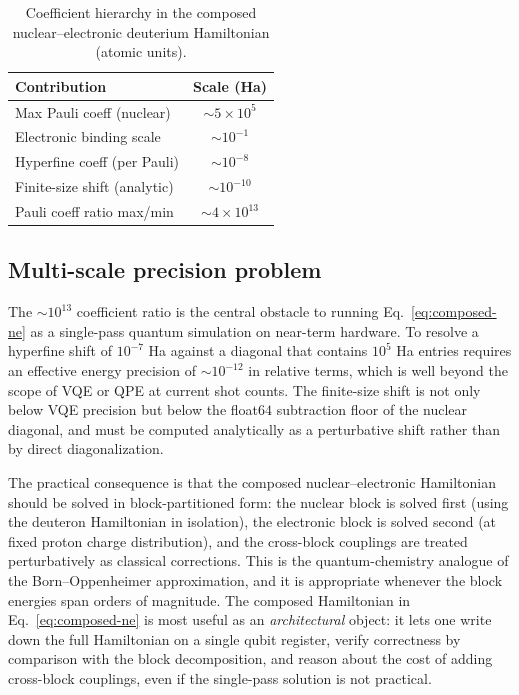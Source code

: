 \documentclass[twocolumn,prc,amsmath,amssymb,superscriptaddress]{revtex4-2}
\begin{document}
\begin{table}[t]
  \centering
  \caption{Coefficient hierarchy in the composed nuclear--electronic
    deuterium Hamiltonian (atomic units).}
  \label{tab:ne-scales}
  \begin{ruledtabular}
  \begin{tabular}{lc}
    Contribution & Scale (Ha) \\
    \hline
    Max Pauli coeff (nuclear)    & $\sim 5 \times 10^{5}$ \\
    Electronic binding scale     & $\sim 10^{-1}$ \\
    Hyperfine coeff (per Pauli)  & $\sim 10^{-8}$ \\
    Finite-size shift (analytic) & $\sim 10^{-10}$ \\
    \hline
    Pauli coeff ratio max/min    & $\sim 4 \times 10^{13}$ \\
  \end{tabular}
  \end{ruledtabular}
\end{table}

\subsection{Multi-scale precision problem}

The $\sim 10^{13}$ coefficient ratio is the central obstacle to
running Eq.~\eqref{eq:composed-ne} as a single-pass quantum simulation
on near-term hardware. To resolve a hyperfine shift of $10^{-7}$ Ha
against a diagonal that contains $10^5$ Ha entries requires an
effective energy precision of $\sim 10^{-12}$ in relative terms,
which is well beyond the scope of VQE or QPE at current shot counts. The
finite-size shift is not only below VQE precision but below the
float$64$ subtraction floor of the nuclear diagonal, and must be
computed analytically as a perturbative shift rather than by direct
diagonalization.

The practical consequence is that the composed nuclear--electronic
Hamiltonian should be solved in block-partitioned form: the nuclear
block is solved first (using the deuteron Hamiltonian in isolation),
the electronic block is solved second (at fixed proton charge
distribution), and the cross-block couplings are treated
perturbatively as classical corrections. This is the quantum-chemistry
analogue of the Born--Oppenheimer approximation, and it is appropriate
whenever the block energies span orders of magnitude. The composed
Hamiltonian in Eq.~\eqref{eq:composed-ne} is most useful as an
\emph{architectural} object: it lets one write down the full
Hamiltonian on a single qubit register, verify correctness by
comparison with the block decomposition, and reason about the cost
of adding cross-block couplings, even if the single-pass solution is
not practical.
\end{document}
